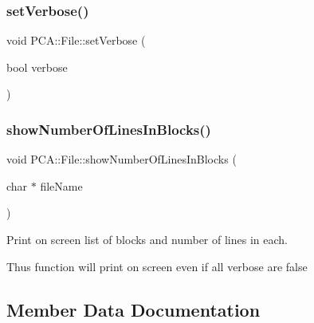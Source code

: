 \hypertarget{class_p_c_a_1_1_file_a71cb80c09faa4be71eb09ae074aac4b2}{}\label{class_p_c_a_1_1_file_a71cb80c09faa4be71eb09ae074aac4b2} 
\subsubsection{\texorpdfstring{set\+Verbose()}{setVerbose()}}
{\footnotesize\ttfamily void P\+C\+A\+::\+File\+::set\+Verbose (\begin{DoxyParamCaption}\item[{bool}]{verbose }\end{DoxyParamCaption})\hspace{0.3cm}{\ttfamily [static]}}

\hypertarget{class_p_c_a_1_1_file_a25dd7a0266edd1fc026f27448003b36f}{}\label{class_p_c_a_1_1_file_a25dd7a0266edd1fc026f27448003b36f} 
\subsubsection{\texorpdfstring{show\+Number\+Of\+Lines\+In\+Blocks()}{showNumberOfLinesInBlocks()}}
{\footnotesize\ttfamily void P\+C\+A\+::\+File\+::show\+Number\+Of\+Lines\+In\+Blocks (\begin{DoxyParamCaption}\item[{char $\ast$}]{file\+Name }\end{DoxyParamCaption})\hspace{0.3cm}{\ttfamily [static]}}



Print on screen list of blocks and number of lines in each. 

Thus function will print on screen even if all verbose are false 

\subsection{Member Data Documentation}
\hypertarget{class_p_c_a_1_1_file_a7d78765563f9be7e1ca260dcd3c65053}{}\label{class_p_c_a_1_1_file_a7d78765563f9be7e1ca260dcd3c65053} 
